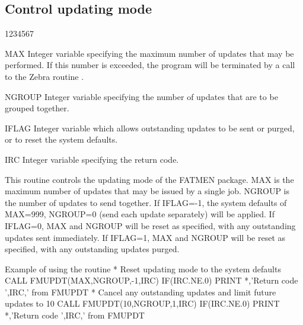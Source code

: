 \subsection{Control updating mode}
\begin{DLtt}{1234567}
\item[MAX]
Integer variable specifying the maximum number of updates
that may be performed. If this number is exceeded, the program
will be terminated by a call to the Zebra routine .
\item[NGROUP]
Integer variable specifying the number of updates that are
to be grouped together.
\item[IFLAG]
Integer variable which allows outstanding updates to be sent
or purged, or to reset the system defaults.
\item[IRC ]
Integer variable specifying the return code.
\end{DLtt}
\par
This routine controls the updating mode of the FATMEN package.
MAX is the maximum number of updates that may be issued by a single
job. NGROUP is the number of updates to send together.
If IFLAG=-1, the system defaults of MAX=999, NGROUP=0 (send each
update separately) will be applied. If IFLAG=0, MAX and NGROUP
will be reset as specified, with any outstanding updates sent
immediately. If IFLAG=1, MAX and NGROUP will be reset as specified,
with any outstanding updates purged.
\begin{XMPt}{Example of using the \protect{} routine}
*     Reset updating mode to the system defaults
      CALL FMUPDT(MAX,NGROUP,-1,IRC)
      IF(IRC.NE.0) PRINT *,'Return code ',IRC,' from FMUPDT
*     Cancel any outstanding updates and limit future updates to 10
      CALL FMUPDT(10,NGROUP,1,IRC)
      IF(IRC.NE.0) PRINT *,'Return code ',IRC,' from FMUPDT
\end{XMPt}
 
